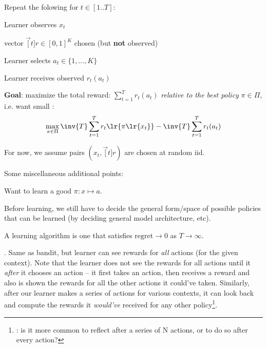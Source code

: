 \documentclass[11pt]{article}
\begin{document}
\begin{algorithm}
	Repeat the folowing for $t \in [1..T]$:
	\begin{compactenum}
		\item Learner observes  $x_t$
		\item {} vector $\vec[t]{r} \in [0, 1]^K$ chosen (but \textbf{not} observed)
		\item Learner selects  $a_t \in \{1, \ldots, K\}$
		\item Learner receives observed  $r_t(a_t)$ 
	\end{compactenum}

	\textbf{Goal}: maximize the total reward: $\sum_{t=1}^T r_t(a_t)$ \textit{relative to the best policy} $\pi \in \Pi$, i.e. want small :
	\begin{align}
		\max_{\pi \in \Pi} \inv{T} \sum_{t=1}^T r_t\lr{ \pi\lr{ x_t } } 
		- \inv{T} \sum_{t=1}^T r_t (a_t)
	\end{align}
	
	For now, we assume pairs $(x_t, \vec[t]{r})$ are chosen at random iid. 
\end{algorithm}

Some miscellaneous additional points: 
\begin{compactitem}
	\item Want to learn a good  $\pi: x \mapsto a$.
	\item Before learning, we still have to decide the general form/space of possible policies that can be learned (by deciding general model architecture, etc). 
	\item A  learning algorithm is one that satisfies $\text{regret} \rightarrow 0$ as $T \rightarrow \infty$. 
\end{compactitem}
 
. Same as bandit, but learner can see rewards for \textit{all} actions (for the given context). Note that the learner does not see the rewards for all actions until it \textit{after} it chooses an action -- it first takes an action, then receives a reward and also is shown the rewards for all the other actions it could've taken. Similarly, after our learner makes a series of actions for various contexts, it can look back and compute the rewards it \textit{would've} received for any other policy\footnote{: is it more common to reflect after a series of N actions, or to do so after every action?}.
\end{document}
